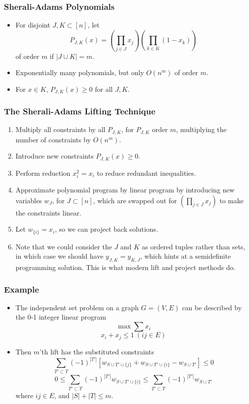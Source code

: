 \documentclass{beamer}
\begin{document}
\begin{frame}
    \frametitle{Sherali-Adams Polynomials}

    \begin{itemize}
        \item For disjoint $J,K \subset [n]$, let
        \[ P_{J,K}(x) = \left( \prod_{j \in J} x_j \right) \left( \prod_{k \in K} (1 - x_k) \right) \]
        of order $m$ if $|J \cup K| = m$.
        \item Exponentially many polynomials, but only $O(n^m)$ of order $m$.
        \item For $x \in K$, $P_{J,K}(x) \geq 0$ for all $J,K$.
    \end{itemize}
\end{frame}

\begin{frame}
    \frametitle{The Sherali-Adams Lifting Technique}

    \begin{enumerate}
        \item Multiply all constraints by all $P_{J,K}$, for $P_{J,K}$ order $m$, multiplying the number of constraints by $O(n^m)$.
        \item Introduce new constraints $P_{J,K}(x) \geq 0$.
        \item Perform reduction $x_i^2 = x_i$ to reduce redundant inequalities.
        \item Approximate polynomial program by linear program by introducing new variables $w_J$, for $J \subset [n]$, which are swapped out for $\left( \prod_{j \in J} x_j \right)$ to make the constraints linear.
        \item Let $w_{\{i\}} = x_i$, so we can project back solutions.
        \item Note that we could consider the $J$ and $K$ as ordered tuples rather than sets, in which case we should have $y_{J,K} = y_{K,J}$, which hints at a semidefinite programming solution. This is what modern lift and project methods do.
    \end{enumerate}
\end{frame}

\begin{frame}
    \frametitle{Example}

    \begin{itemize}
        \item The independent set problem on a graph $G = (V,E)$ can be described by the 0-1 integer linear program
        \[ \max \sum x_i \]
        \[ x_i + x_j \leq 1\ (ij \in E) \]
        \item Then $m$'th lift has the substituted constraints
        \[ \sum_{T' \subset T} (-1)^{|T'|} [w_{S \cup T' \cup \{ j \}} + w_{S \cup T' \cup \{ i \}} - w_{S \cup T'}] \leq 0 \]
        \[ 0 \leq \sum_{T' \subset T} (-1)^{|T'|} w_{S \cup T' \cup \{ i \}} \leq \sum_{T' \subset T} (-1)^{|T'|} w_{S \cup T'} \]
        where $ij \in E$, and $|S| + |T| \leq m$.
    \end{itemize}
\end{frame}
\end{document}
